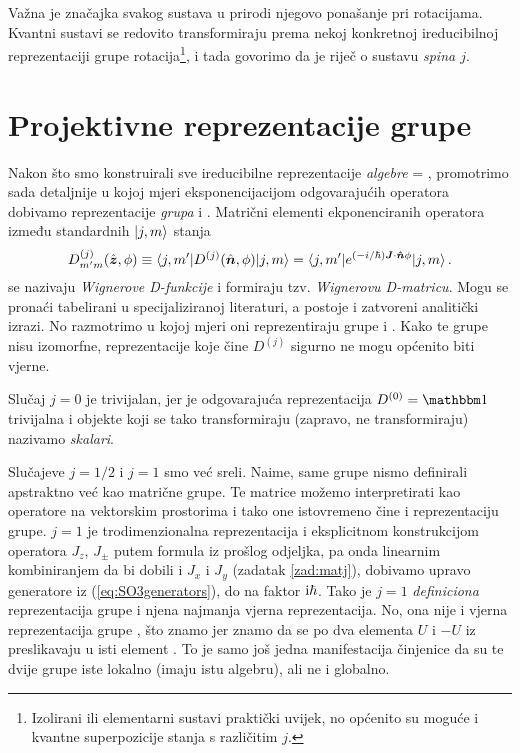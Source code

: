 Važna je značajka svakog sustava u prirodi 
njegovo ponašanje pri rotacijama. Kvantni sustavi se redovito
transformiraju prema nekoj konkretnoj ireducibilnoj reprezentaciji grupe
rotacija\footnote{Izolirani ili elementarni sustavi praktički uvijek, no
    općenito su moguće i kvantne superpozicije stanja s različitim $j$.}, i
 tada govorimo da je riječ o sustavu \emph{spina $j$}.


\section{Projektivne reprezentacije grupe }
 \label{sec:projektivnerep}

Nakon što smo konstruirali sve ireducibilne reprezentacije \emph{algebre} 
 = , promotrimo sada detaljnije u kojoj mjeri eksponencijacijom
odgovarajućih operatora dobivamo reprezentacije \emph{grupa}  i .
Matrični elementi ekponenciranih operatora između standardnih
$| j, m \rangle$ stanja
\begin{equation}
    D^{(j)}_{m'm}(\hat{\vec{z}},\phi)  \equiv  \bra{j,m'} D^{(j)}(\hat{\vec{n}},\phi) \ket{j, m} 
    =\bra{j,m'} e^{(-i/\hbar)\vec{J}\cdot\unitn\phi}\ket{j, m} \,.
    \label{eq:WignerD}
\end{equation}
se nazivaju \emph{Wignerove D-funkcije} i formiraju tzv. \emph{Wignerovu D-matricu}.
Mogu se pronaći tabelirani u specijaliziranoj literaturi, a postoje
i zatvoreni analitički izrazi. No razmotrimo u kojoj mjeri oni
reprezentiraju grupe  i . Kako te grupe nisu izomorfne,
reprezentacije koje čine $D^{(j)}$ sigurno ne mogu općenito biti vjerne.

Slučaj $j=0$ je trivijalan, jer je odgovarajuća reprezentacija $D^{(0)}=\Eins$
trivijalna i objekte koji se tako transformiraju (zapravo, ne transformiraju)
nazivamo \emph{skalari}.

Slučajeve $j=1/2$ i $j=1$ smo već sreli. Naime, same grupe nismo definirali
apstraktno već kao matrične grupe. Te matrice možemo interpretirati kao operatore
na vektorskim prostorima i tako one istovremeno čine i reprezentaciju grupe.
$j=1$ je trodimenzionalna reprezentacija i eksplicitnom konstrukcijom
operatora $J_z$, $J_\pm$ putem formula iz prošlog odjeljka, pa onda linearnim
kombiniranjem da bi dobili i $J_x$ i $J_y$ (zadatak \ref{zad:matj}), 
dobivamo upravo generatore iz (\ref{eq:SO3generators}), do na faktor $\textrm{i}\hbar$.
Tako je $j=1$ \emph{definiciona} reprezentacija grupe  i njena najmanja
vjerna reprezentacija.
No, ona nije i vjerna reprezentacija grupe , što znamo jer znamo da
se po dva elementa $U$ i $-U$ iz   preslikavaju u isti element 
. To je samo još jedna manifestacija činjenice da su te dvije grupe
iste lokalno (imaju istu algebru), ali ne i globalno.


